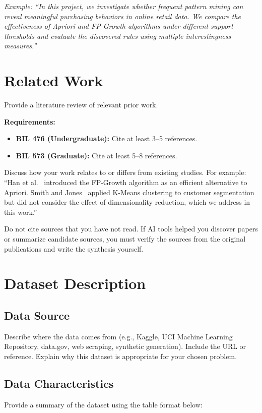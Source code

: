 \documentclass[conference]{IEEEtran}
\begin{document}
	\textit{Example: ``In this project, we investigate whether frequent pattern mining can reveal meaningful purchasing behaviors in online retail data. We compare the effectiveness of Apriori and FP-Growth algorithms under different support thresholds and evaluate the discovered rules using multiple interestingness measures.''}
	
	\section{Related Work}
	\label{sec:related_work}
	
	Provide a literature review of relevant prior work.
	
	\textbf{Requirements:}
	\begin{itemize}
		\item \textbf{BIL 476 (Undergraduate):} Cite at least 3--5 references.
		\item \textbf{BIL 573 (Graduate):} Cite at least 5--8 references.
	\end{itemize}
	
	Discuss how your work relates to or differs from existing studies. For example: ``Han et al.~\cite{b1} introduced the FP-Growth algorithm as an efficient alternative to Apriori. Smith and Jones~\cite{b2} applied K-Means clustering to customer segmentation but did not consider the effect of dimensionality reduction, which we address in this work.''
	
	Do not cite sources that you have not read. If AI tools helped you discover papers or summarize candidate sources, you must verify the sources from the original publications and write the synthesis yourself.
	
	\section{Dataset Description}
	\label{sec:dataset}
	
	\subsection{Data Source}
	Describe where the data comes from (e.g., Kaggle, UCI Machine Learning Repository, data.gov, web scraping, synthetic generation). Include the URL or reference. Explain why this dataset is appropriate for your chosen problem.
	
	\subsection{Data Characteristics}
	Provide a summary of the dataset using the table format below:
	
\end{document}
